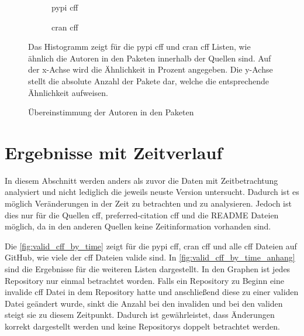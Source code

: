 \begin{figure}
    \begin{subfigure}{.5\textwidth}
        \centering
        
        \caption{\gls{pypi} \gls{cff}}
        \label{fig:similarity_pypi_cff}
    \end{subfigure}%
    \begin{subfigure}{.5\textwidth}
        \centering
        
        \caption{\gls{cran} \gls{cff}}
        \label{fig:similarity_cran_cff}
    \end{subfigure}
    \caption{Übereinstimmung der Autoren in den Paketen}
    \label{fig:similarities}
    \small
    \raggedright
    Das Histogramm zeigt für die \gls{pypi} \gls{cff} und \gls{cran} \gls{cff} Listen, wie ähnlich die Autoren in den Paketen innerhalb der Quellen sind. Auf der x-Achse wird die Ähnlichkeit in Prozent angegeben. Die y-Achse stellt die absolute Anzahl der Pakete dar, welche die entsprechende Ähnlichkeit aufweisen.
\end{figure}

\section{Ergebnisse mit Zeitverlauf}
\label{sec:gesamtheit_ergebnisse}
In diesem Abschnitt werden anders als zuvor die Daten mit Zeitbetrachtung analysiert und nicht lediglich die jeweils neuste Version untersucht.
Dadurch ist es möglich Veränderungen in der Zeit zu betrachten und zu analysieren.
Jedoch ist dies nur für die Quellen \gls{cff}, \glqq preferred-citation\grqq{} \gls{cff} und die README Dateien möglich, da in den anderen Quellen keine Zeitinformation vorhanden sind.

Die \autoref{fig:valid_cff_by_time} zeigt für die \gls{pypi} \gls{cff}, \gls{cran} \gls{cff} und alle \gls{cff} Dateien auf GitHub, wie viele der \gls{cff} Dateien valide sind.
In \autoref{fig:valid_cff_by_time_anhang} sind die Ergebnisse für die weiteren Listen dargestellt.
In den Graphen ist jedes Repository nur einmal betrachtet worden.
Falls ein Repository zu Beginn eine invalide \gls{cff} Datei in dem Repository hatte und anschließend diese zu einer validen Datei geändert wurde, sinkt die Anzahl bei den invaliden und bei den validen steigt sie zu diesem Zeitpunkt.
Dadurch ist gewährleistet, dass Änderungen korrekt dargestellt werden und keine Repositorys doppelt betrachtet werden.

